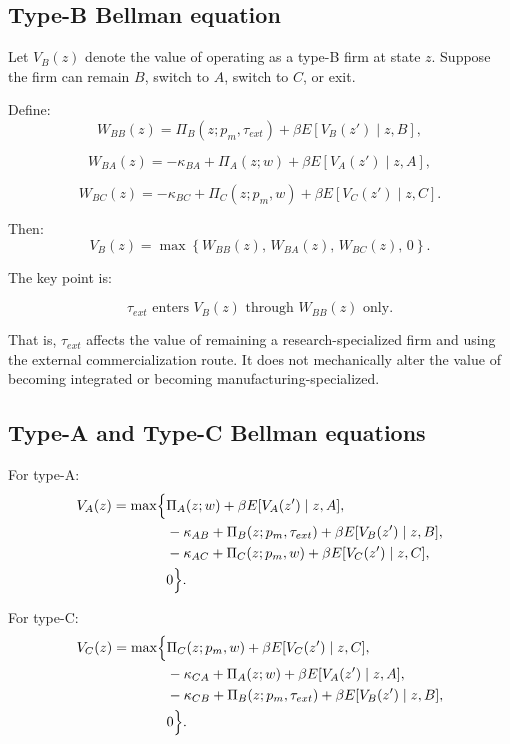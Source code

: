 \documentclass[12pt]{article}
\begin{document}
\subsection{Type-B Bellman equation}

Let \(V_B(z)\) denote the value of operating as a type-B firm at state \(z\).
Suppose the firm can remain \(B\), switch to \(A\), switch to \(C\), or exit.

Define:
\[
W_{BB}(z)
=
\Pi_B(z;p_m,\tau_{ext})
+
\beta E\left[V_B(z')\mid z,B\right],
\]

\[
W_{BA}(z)
=
-\kappa_{BA}
+
\Pi_A(z;w)
+
\beta E\left[V_A(z')\mid z,A\right],
\]

\[
W_{BC}(z)
=
-\kappa_{BC}
+
\Pi_C(z;p_m,w)
+
\beta E\left[V_C(z')\mid z,C\right].
\]

Then:
\[
V_B(z)
=
\max\left\{
W_{BB}(z),\,
W_{BA}(z),\,
W_{BC}(z),\,
0
\right\}.
\]

The key point is:

\[
\tau_{ext} \text{ enters } V_B(z) \text{ through } W_{BB}(z) \text{ only.}
\]

That is, \(\tau_{ext}\) affects the value of remaining a research-specialized firm and using
the external commercialization route. It does not mechanically alter the value of becoming
integrated or becoming manufacturing-specialized.

\subsection{Type-A and Type-C Bellman equations}

For type-A:
\[
\begin{aligned}
V_A(z)
=
\max\Bigl\{&
\Pi_A(z;w)+\beta E[V_A(z')\mid z,A],\\
&-\kappa_{AB}+\Pi_B(z;p_m,\tau_{ext})+\beta E[V_B(z')\mid z,B],\\
&-\kappa_{AC}+\Pi_C(z;p_m,w)+\beta E[V_C(z')\mid z,C],\\
&0
\Bigr\}.
\end{aligned}
\]

For type-C:
\[
\begin{aligned}
V_C(z)
=
\max\Bigl\{&
\Pi_C(z;p_m,w)+\beta E[V_C(z')\mid z,C],\\
&-\kappa_{CA}+\Pi_A(z;w)+\beta E[V_A(z')\mid z,A],\\
&-\kappa_{CB}+\Pi_B(z;p_m,\tau_{ext})+\beta E[V_B(z')\mid z,B],\\
&0
\Bigr\}.
\end{aligned}
\]
\end{document}
